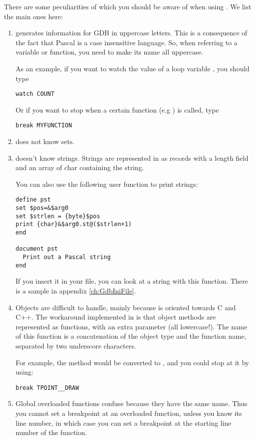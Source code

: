 There are some peculiarities of \fpc which you should be aware of when using
. We list the main ones here:
\begin{enumerate}
\item \fpc generates information for GDB in uppercase letters. This is a
consequence of the fact that Pascal is a case insensitive language. So, when
referring to a variable or function, you need to make its name all
uppercase.

As an example, if you want to watch the value of a loop variable
, you should type
\begin{verbatim}
watch COUNT
\end{verbatim}
Or if you want to stop when a certain function (e.g ) is called,
type
\begin{verbatim}
break MYFUNCTION
\end{verbatim}

\item {} does not know sets.

\item {} doesn't know strings. Strings are represented in 
as records with a length field and an array of char containing the string.

You can also use the following user function to print strings:
\begin{verbatim}
define pst
set $pos=&$arg0
set $strlen = {byte}$pos
print {char}&$arg0.st@($strlen+1)
end

document pst
  Print out a Pascal string
end
\end{verbatim}
If you insert it in your  file, you can look at a string with this
function. There is a sample  in appendix \ref{ch:GdbIniFile}.

\item Objects are difficult to handle, mainly because  is oriented
towards C and C++. The workaround implemented in \fpc is that object methods
are represented as functions, with an extra parameter  (all
lowercase!). The name of this function is a concatenation of the object type
and the function name, separated by two underscore characters.

For example, the method  would be converted to
, and you could stop at it by using:
\begin{verbatim}
break TPOINT__DRAW
\end{verbatim}

\item Global overloaded functions confuse  because they have the same
name. Thus you cannot set a breakpoint at an overloaded function, unless you
know its line number, in which case you can set a breakpoint at the
starting line number of the function.
\end{enumerate}

